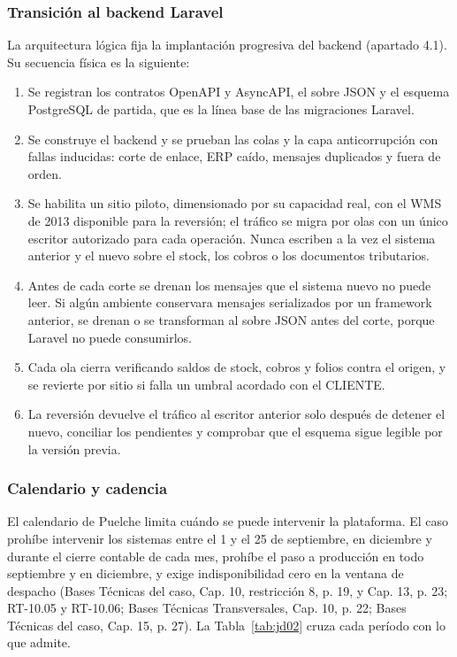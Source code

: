 \subsubsection{Transición al backend Laravel}

La arquitectura lógica fija la implantación progresiva del backend (apartado 4.1). Su secuencia física es la siguiente:

\begin{enumerate}
  \item Se registran los contratos OpenAPI y AsyncAPI, el sobre JSON y el esquema PostgreSQL de partida, que es la línea base de las migraciones Laravel.
  \item Se construye el backend y se prueban las colas y la capa anticorrupción con fallas inducidas: corte de enlace, ERP caído, mensajes duplicados y fuera de orden.
  \item Se habilita un sitio piloto, dimensionado por su capacidad real, con el WMS de 2013 disponible para la reversión; el tráfico se migra por olas con un único escritor autorizado para cada operación. Nunca escriben a la vez el sistema anterior y el nuevo sobre el stock, los cobros o los documentos tributarios.
  \item Antes de cada corte se drenan los mensajes que el sistema nuevo no puede leer. Si algún ambiente conservara mensajes serializados por un framework anterior, se drenan o se transforman al sobre JSON antes del corte, porque Laravel no puede consumirlos.
  \item Cada ola cierra verificando saldos de stock, cobros y folios contra el origen, y se revierte por sitio si falla un umbral acordado con el CLIENTE.
  \item La reversión devuelve el tráfico al escritor anterior solo después de detener el nuevo, conciliar los pendientes y comprobar que el esquema sigue legible por la versión previa.
\end{enumerate}

\subsubsection{Calendario y cadencia}

El calendario de Puelche limita cuándo se puede intervenir la plataforma. El caso prohíbe intervenir los sistemas entre el 1 y el 25 de septiembre, en diciembre y durante el cierre contable de cada mes, prohíbe el paso a producción en todo septiembre y en diciembre, y exige indisponibilidad cero en la ventana de despacho (Bases Técnicas del caso, Cap. 10, restricción 8, p. 19, y Cap. 13, p. 23; RT-10.05 y RT-10.06; Bases Técnicas Transversales, Cap. 10, p. 22; Bases Técnicas del caso, Cap. 15, p. 27). La Tabla~\ref{tab:jd02} cruza cada período con lo que admite.

